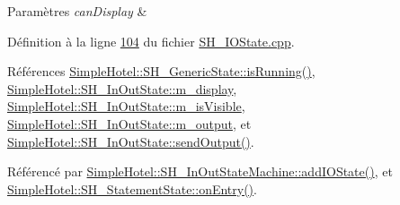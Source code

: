 \begin{DoxyParams}{Paramètres}
{\em can\-Display} & \\
\hline
\end{DoxyParams}


Définition à la ligne \hyperlink{SH__IOState_8cpp_source_l00104}{104} du fichier \hyperlink{SH__IOState_8cpp_source}{S\-H\-\_\-\-I\-O\-State.\-cpp}.



Références \hyperlink{classSimpleHotel_1_1SH__GenericState_a5151ff071129bdd4dcf7c60cb93794da}{Simple\-Hotel\-::\-S\-H\-\_\-\-Generic\-State\-::is\-Running()}, \hyperlink{classSimpleHotel_1_1SH__InOutState_a219039bbe5e46a91dfd7aa51fb530ae4}{Simple\-Hotel\-::\-S\-H\-\_\-\-In\-Out\-State\-::m\-\_\-display}, \hyperlink{classSimpleHotel_1_1SH__InOutState_a041ad53f3cdfb1b18ee002597e833848}{Simple\-Hotel\-::\-S\-H\-\_\-\-In\-Out\-State\-::m\-\_\-is\-Visible}, \hyperlink{classSimpleHotel_1_1SH__InOutState_ab3dc360d32c8da2b958f8cdda90a8518}{Simple\-Hotel\-::\-S\-H\-\_\-\-In\-Out\-State\-::m\-\_\-output}, et \hyperlink{classSimpleHotel_1_1SH__InOutState_a6f39ba3a9682ece4a0d2c96e8f8983a0}{Simple\-Hotel\-::\-S\-H\-\_\-\-In\-Out\-State\-::send\-Output()}.



Référencé par \hyperlink{classSimpleHotel_1_1SH__InOutStateMachine_a07ae9f1f74a9a41b26e77a014679a33e}{Simple\-Hotel\-::\-S\-H\-\_\-\-In\-Out\-State\-Machine\-::add\-I\-O\-State()}, et \hyperlink{classSimpleHotel_1_1SH__StatementState_a0b70f003ac6617fa2d3a43e07a3e4319}{Simple\-Hotel\-::\-S\-H\-\_\-\-Statement\-State\-::on\-Entry()}.


